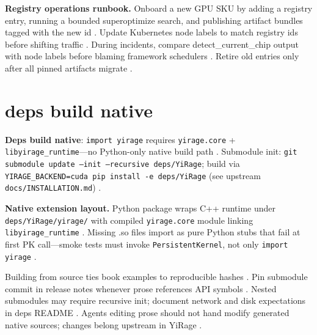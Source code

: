 \textbf{Registry operations runbook.} Onboard a new GPU SKU by adding a registry entry, running a bounded superoptimize search, and publishing artifact bundles tagged with the new id \citep{yirage2026,chen2020compilerbasedhardw,patel2025llminference,semianalysis2024tma,dlbook}. Update Kubernetes node labels to match registry ids before shifting traffic \citep{patel2025llminference,yirage2026,chen2020compilerbasedhardw,kwon2023vllm,dlbook}. During incidents, compare detect\_current\_chip output with node labels before blaming framework schedulers \citep{yirage2026,chen2020compilerbasedhardw,patel2025llminference,kwon2023vllm,taxbreak2026,memoryfloor2026,dlbook}. Retire old entries only after all pinned artifacts migrate \citep{yirage2026,chen2020compilerbasedhardw,patel2025llminference,dlbook}.

\section{deps build native}
\label{sec:ch29_deps_build_native}

\textbf{Deps build native}: \texttt{import yirage} requires \texttt{yirage.core} + \texttt{libyirage\_runtime}---no Python-only native build path \citep{yirage2026,chen2020compilerbasedhardw,patel2025llminference,dlbook}. Submodule init: \texttt{git submodule update --init --recursive deps/YiRage}; build via \texttt{YIRAGE\_BACKEND=cuda pip install -e deps/YiRage} (see upstream \texttt{docs/INSTALLATION.md}) \citep{yirage2026,chen2020compilerbasedhardw,taxbreak2026,memoryfloor2026,kwon2023vllm,liu2024deepseekv3,amd2024xdna,amd2024aie,semianalysis2024tma,dao2022flashattention,dao2023flashdecoding,nvidia2022hopper,nvidia2024cudagraphs,patel2025llminference,dlbook}.

\textbf{Native extension layout.} Python package wraps C++ runtime under \texttt{deps/YiRage/yirage/} with compiled \texttt{yirage.core} module linking \texttt{libyirage\_runtime} \citep{yirage2026,chen2020compilerbasedhardw,patel2025llminference,dlbook,taxbreak2026,memoryfloor2026,kwon2023vllm,liu2024deepseekv3,amd2024xdna,amd2024aie,semianalysis2024tma,dao2022flashattention,dao2023flashdecoding,nvidia2022hopper,nvidia2024cudagraphs,dlbook}. Missing .so files import as pure Python stubs that fail at first PK call---smoke tests must invoke \texttt{PersistentKernel}, not only \texttt{import yirage} \citep{yirage2026,chen2020compilerbasedhardw,patel2025llminference,dlbook}.

Building from source ties book examples to reproducible hashes \citep{yirage2026,chen2020compilerbasedhardw,patel2025llminference,dlbook}. Pin submodule commit in release notes whenever prose references API symbols \citep{yirage2026,chen2020compilerbasedhardw,patel2025llminference,dlbook}. Nested submodules may require recursive init; document network and disk expectations in deps README \citep{yirage2026,chen2020compilerbasedhardw,patel2025llminference,dlbook}. Agents editing prose should not hand modify generated native sources; changes belong upstream in YiRage \citep{yirage2026,chen2020compilerbasedhardw,patel2025llminference,dlbook}.

